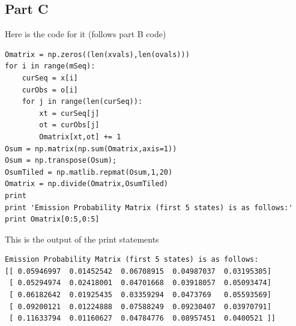 \documentclass[twoside,11pt]{article}
\theoremstyle{definition}
\begin{document}
\subsection*{Part C}

Here is the code for it (follows part B code)

\begin{lstlisting}
Omatrix = np.zeros((len(xvals),len(ovals)))
for i in range(mSeq):
    curSeq = x[i]
    curObs = o[i]
    for j in range(len(curSeq)):
        xt = curSeq[j]
        ot = curObs[j]
        Omatrix[xt,ot] += 1
Osum = np.matrix(np.sum(Omatrix,axis=1))
Osum = np.transpose(Osum);
OsumTiled = np.matlib.repmat(Osum,1,20)
Omatrix = np.divide(Omatrix,OsumTiled)
print
print 'Emission Probability Matrix (first 5 states) is as follows:'
print Omatrix[0:5,0:5]
\end{lstlisting}

This is the output of the print statements
\begin{lstlisting}
Emission Probability Matrix (first 5 states) is as follows:
[[ 0.05946997  0.01452542  0.06708915  0.04987037  0.03195305]
 [ 0.05294974  0.02418001  0.04701668  0.03918057  0.05093474]
 [ 0.06182642  0.01925435  0.03359294  0.0473769   0.05593569]
 [ 0.09200121  0.01224888  0.07588249  0.09230407  0.03970791]
 [ 0.11633794  0.01160627  0.04784776  0.08957451  0.0400521 ]]
\end{lstlisting}
\end{document}
